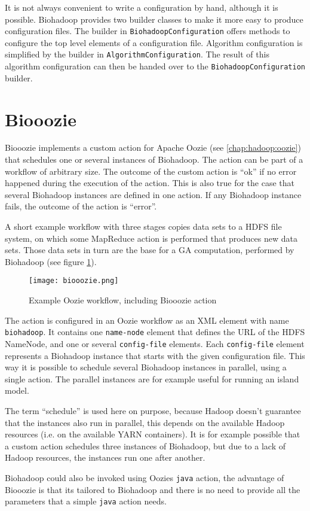 It is not always convenient to write a configuration by hand, although it is possible. Biohadoop provides two builder classes to make it more easy to produce configuration files. The builder in \texttt{BiohadoopConfiguration} offers methods to configure the top level elements of a configuration file. Algorithm configuration is simplified by the builder in \texttt{AlgorithmConfiguration}. The result of this algorithm configuration can then be handed over to the \texttt{BiohadoopConfiguration} builder.

\section{Biooozie}
\label{chap:impl:oozie}
Biooozie implements a custom action for Apache Oozie (see \ref{chap:hadoop:oozie}) that schedules one or several instances of Biohadoop. The action can be part of a workflow of arbitrary size. The outcome of the custom action is ``ok'' if no error happened during the execution of the action. This is also true for the case that several Biohadoop instances are defined in one action. If any Biohadoop instance fails, the outcome of the action is ``error''.

A short example workflow with three stages copies data sets to a HDFS file system, on which some MapReduce action is performed that produces new data sets. Those data sets in turn are the base for a GA computation, performed by Biohadoop (see figure \ref{fig:biooozie}).

\begin{figure}[ht!]
  \centering
  \texttt{[image: biooozie.png]}
  \caption{Example Oozie workflow, including Biooozie action}
  \label{fig:biooozie}
\end{figure}

The action is configured in an Oozie workflow as an XML element with name \texttt{biohadoop}. It contains one \texttt{name-node} element that defines the URL of the HDFS NameNode, and one or several \texttt{config-file} elements. Each \texttt{config-file} element represents a Biohadoop instance that starts with the given configuration file. This way it is possible to schedule several Biohadoop instances in parallel, using a single action. The parallel instances are for example useful for running an island model.

The term ``schedule'' is used here on purpose, because Hadoop doesn't guarantee that the instances also run in parallel, this depends on the available Hadoop resources (i.e. on the available YARN containers). It is for example possible that a custom action schedules three instances of Biohadoop, but due to a lack of Hadoop resources, the instances run one after another.

Biohadoop could also be invoked using Oozies \texttt{java} action, the advantage of Biooozie is that its tailored to Biohadoop and there is no need to provide all the parameters that a simple \texttt{java} action needs. 